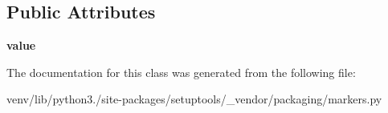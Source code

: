 \subsection*{Public Attributes}
\begin{DoxyCompactItemize}
\item 
\mbox{\label{classsetuptools_1_1__vendor_1_1packaging_1_1markers_1_1_node_add7c503e0d7d38e590d471eb64d253a1}} 
{\bfseries value}
\end{DoxyCompactItemize}


The documentation for this class was generated from the following file\+:\begin{DoxyCompactItemize}
\item 
venv/lib/python3./site-\/packages/setuptools/\+\_\+vendor/packaging/markers.\+py\end{DoxyCompactItemize}
